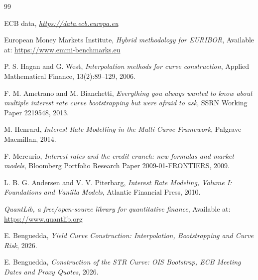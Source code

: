 \documentclass[11pt,a4paper]{article}
\theoremstyle{plain}
\theoremstyle{definition}
\begin{document}
\begin{thebibliography}{99}

ECB data,
\textit{\url{https://data.ecb.europa.eu}}

European Money Markets Institute,
\textit{Hybrid methodology for EURIBOR},
Available at: \url{https://www.emmi-benchmarks.eu}

P. S. Hagan and G. West,
\textit{Interpolation methods for curve construction},
Applied Mathematical Finance, 13(2):89--129, 2006.

F. M. Ametrano and M. Bianchetti,
\textit{Everything you always wanted to know about multiple interest rate curve bootstrapping but were afraid to ask},
SSRN Working Paper 2219548, 2013.

M. Henrard,
\textit{Interest Rate Modelling in the Multi-Curve Framework},
Palgrave Macmillan, 2014.

F. Mercurio,
\textit{Interest rates and the credit crunch: new formulas and market models},
Bloomberg Portfolio Research Paper 2009-01-FRONTIERS, 2009.

L. B. G. Andersen and V. V. Piterbarg,
\textit{Interest Rate Modeling, Volume I: Foundations and Vanilla Models},
Atlantic Financial Press, 2010.

\textit{QuantLib, a free/open-source library for quantitative finance},
Available at: \url{https://www.quantlib.org}

E. Benguedda,
\textit{Yield Curve Construction: Interpolation, Bootstrapping and Curve Risk},
2026.

E. Benguedda,
\textit{Construction of the \texteuro STR Curve: OIS Bootstrap, ECB Meeting Dates and Proxy Quotes},
2026.

\end{thebibliography}
\end{document}

